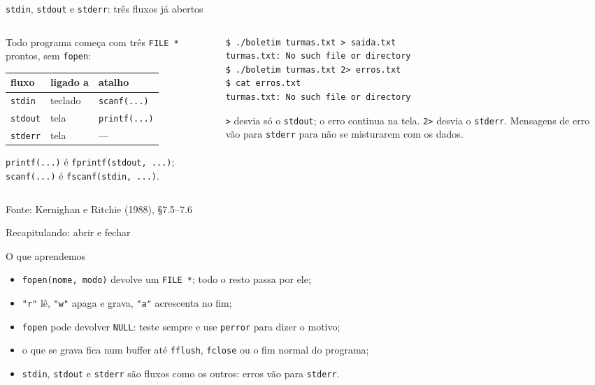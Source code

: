 \documentclass[aspectratio=169]{beamer}
\newcommand{\fonte}[1]{\vfill\hfill{\scriptsize\textcolor{UFSGray}{Fonte: #1}}}
\begin{document}
\begin{frame}[fragile]{\texttt{stdin}, \texttt{stdout} e \texttt{stderr}: três fluxos já abertos}
  \vspace{-0.3em}
  \begin{columns}[T]
    \begin{column}{0.5\textwidth}
      \small Todo programa começa com três \texttt{FILE *} prontos, sem
      \texttt{fopen}:
      \begin{center}
      \scriptsize
      \begin{tabular}{@{}lll@{}}
        \toprule
        fluxo & ligado a & atalho\\
        \midrule
        \texttt{stdin}  & teclado & \texttt{scanf(...)}\\
        \texttt{stdout} & tela    & \texttt{printf(...)}\\
        \texttt{stderr} & tela    & ---\\
        \bottomrule
      \end{tabular}
      \end{center}
      \texttt{printf(...)} é \texttt{fprintf(stdout, ...)};
      \texttt{scanf(...)} é \texttt{fscanf(stdin, ...)}.
    \end{column}
    \begin{column}{0.46\textwidth}
\begin{lstlisting}[style=shellS]
$ ./boletim turmas.txt > saida.txt
turmas.txt: No such file or directory
$ ./boletim turmas.txt 2> erros.txt
$ cat erros.txt
turmas.txt: No such file or directory
\end{lstlisting}
      \small \texttt{>} desvia só o \texttt{stdout}; o erro continua na
      tela. \texttt{2>} desvia o \texttt{stderr}. Mensagens de erro vão
      para \texttt{stderr} para não se misturarem com os dados.
    \end{column}
  \end{columns}
  \fonte{Kernighan e Ritchie (1988), §7.5--7.6~\cite{kernighan1988c}}
\end{frame}

\begin{frame}{Recapitulando: abrir e fechar}
  \begin{block}{O que aprendemos}
    \begin{itemize}
      \item \texttt{fopen(nome, modo)} devolve um \texttt{FILE *}; todo o
        resto passa por ele;
      \item \texttt{"r"} lê, \texttt{"w"} apaga e grava, \texttt{"a"}
        acrescenta no fim;
      \item \texttt{fopen} pode devolver \texttt{NULL}: teste sempre e use
        \texttt{perror} para dizer o motivo;
      \item o que se grava fica num buffer até \texttt{fflush},
        \texttt{fclose} ou o fim normal do programa;
      \item \texttt{stdin}, \texttt{stdout} e \texttt{stderr} são fluxos
        como os outros: erros vão para \texttt{stderr}.
    \end{itemize}
  \end{block}
\end{frame}
\end{document}

